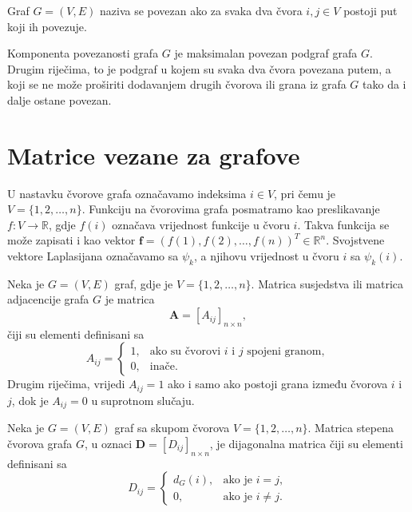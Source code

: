 \begin{definition}
Graf \(G=(V,E)\) naziva se povezan ako za svaka dva čvora \(i,j\in V\) postoji put koji ih povezuje. \cite{juric2019elementi}
\end{definition}
\begin{definition}
Komponenta povezanosti grafa \(G\) je maksimalan povezan podgraf grafa \(G\). Drugim riječima, to je podgraf u kojem su svaka dva čvora povezana putem, a koji se ne može proširiti dodavanjem drugih čvorova ili grana iz grafa \(G\) tako da i dalje ostane povezan. \cite{juric2019elementi}
\end{definition}



\section{Matrice vezane za grafove}

U nastavku čvorove grafa označavamo indeksima \(i\in V\), pri čemu je
\(V=\{1,2,\ldots,n\}\). Funkciju na čvorovima grafa posmatramo kao preslikavanje
\(f:V\to\mathbb{R}\), gdje \(f(i)\) označava vrijednost funkcije u čvoru \(i\).
Takva funkcija se može zapisati i kao vektor
\(\mathbf{f}=(f(1),f(2),\ldots,f(n))^T\in\mathbb{R}^n\). Svojstvene vektore
Laplasijana označavamo sa \(\psi_k\), a njihovu vrijednost u čvoru \(i\) sa
\(\psi_k(i)\).

\begin{definition}
Neka je \(G=(V,E)\) graf, gdje je \(V=\{1,2,\ldots,n\}\). 
Matrica susjedstva ili matrica adjacencije grafa \(G\) je matrica
\begin{equation}
    \mathbf{A} = [A_{ij}]_{n \times n},
\end{equation}
čiji su elementi definisani sa
\begin{equation}
    A_{ij} =
    \begin{cases}
        1, & \text{ako su čvorovi } i \text{ i } j \text{ spojeni granom},\\
        0, & \text{inače}.
    \end{cases}
\end{equation}
Drugim riječima, vrijedi \(A_{ij}=1\) ako i samo ako postoji grana između čvorova \(i\) i \(j\), dok je \(A_{ij}=0\) u suprotnom slučaju. \cite{juric2019elementi}
\end{definition}

\begin{definition} 
Neka je \(G=(V,E)\) graf sa skupom čvorova \(V=\{1,2,\ldots,n\}\). 
Matrica stepena čvorova grafa \(G\), u oznaci \(\mathbf{D}=[D_{ij}]_{n \times n}\), je dijagonalna matrica čiji su elementi definisani sa
\begin{equation}
    D_{ij} =
    \begin{cases}
        d_G(i), & \text{ako je } i=j,\\
        0, & \text{ako je } i \neq j.
    \end{cases}
\end{equation}
\cite{chung1997spectral}
\end{definition}

